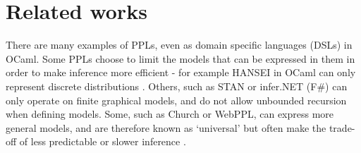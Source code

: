 \section{Related works}
There are many examples of PPLs, even as domain specific languages (DSLs) in OCaml. Some PPLs choose to limit the models that can be expressed in them in order to make inference more efficient - for example HANSEI in OCaml can only represent discrete distributions \cite{kiselyov2009embedded}. Others, such as STAN or infer.NET (F\#) can only operate on finite graphical models, and do not allow unbounded recursion when defining models. Some, such as Church or WebPPL, can express more general models, and are therefore known as `universal' \cite{} but often make the trade-off of less predictable or slower inference \cite{}.



